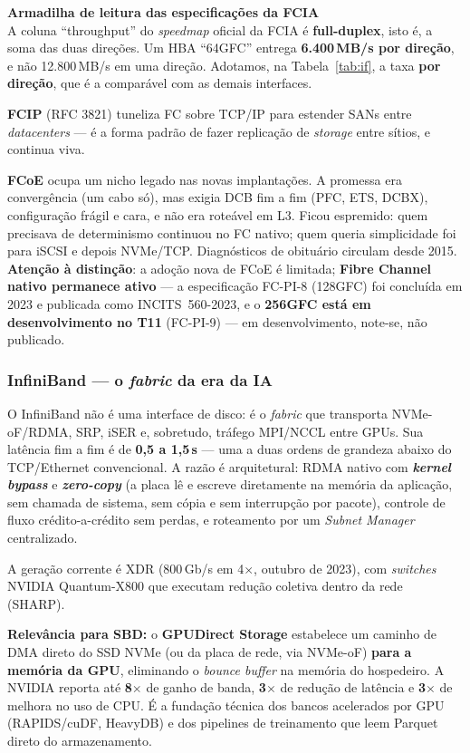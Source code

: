 \documentclass[11pt,a4paper]{article}
\newcommand{\correcao}[2]{%
  \begin{center}\begin{minipage}{0.96\textwidth}
  \colorbox{fundo}{\begin{minipage}{\dimexpr\linewidth-2\fboxsep}
  \vspace{3pt}\textbf{\color{laranja}#1}\\[2pt]\small #2\vspace{4pt}
  \end{minipage}}\end{minipage}\end{center}}
\begin{document}
\correcao{Armadilha de leitura das especificações da FCIA}{%
A coluna ``throughput'' do \emph{speedmap} oficial da FCIA é \textbf{full-duplex}, isto é,
a soma das duas direções. Um HBA ``64GFC'' entrega \textbf{6.400\,MB/s por direção}, e não
12.800\,MB/s em uma direção. Adotamos, na Tabela~\ref{tab:if}, a taxa \textbf{por direção},
que é a comparável com as demais interfaces.}

\textbf{FCIP} (RFC 3821) tuneliza FC sobre TCP/IP para estender SANs entre \emph{datacenters}
--- é a forma padrão de fazer replicação de \emph{storage} entre sítios, e continua viva.

\textbf{FCoE} ocupa um nicho legado nas novas implantações. A promessa era convergência (um cabo só), mas exigia
DCB fim a fim (PFC, ETS, DCBX), configuração frágil e cara, e não era roteável em L3. Ficou
espremido: quem precisava de determinismo continuou no FC nativo; quem queria simplicidade
foi para iSCSI e depois NVMe/TCP. Diagnósticos de obituário circulam desde 2015.
\textbf{Atenção à distinção}: a adoção nova de FCoE é limitada;
\textbf{Fibre Channel nativo permanece ativo} --- a
especificação FC-PI-8 (128GFC) foi concluída em 2023 e publicada como INCITS~560-2023, e o
\textbf{256GFC está em desenvolvimento no T11} (FC-PI-9) --- em desenvolvimento, note-se,
não publicado.

\subsubsection{InfiniBand --- o \emph{fabric} da era da IA}

O InfiniBand não é uma interface de disco: é o \emph{fabric} que transporta NVMe-oF/RDMA,
SRP, iSER e, sobretudo, tráfego MPI/NCCL entre GPUs. Sua latência fim a fim é de
\textbf{0,5 a 1,5\,\textmu s} --- uma a duas ordens de grandeza abaixo do TCP/Ethernet
convencional. A razão é arquitetural: RDMA nativo com \textbf{\emph{kernel bypass}} e
\textbf{\emph{zero-copy}} (a placa lê e escreve diretamente na memória da aplicação, sem
chamada de sistema, sem cópia e sem interrupção por pacote), controle de fluxo
crédito-a-crédito sem perdas, e roteamento por um \emph{Subnet Manager} centralizado.

A geração corrente é XDR (800\,Gb/s em 4$\times$, outubro de 2023), com \emph{switches}
NVIDIA Quantum-X800 que executam redução coletiva dentro da rede (SHARP).

\textbf{Relevância para SBD:} o \textbf{GPUDirect Storage} estabelece um caminho de DMA
direto do SSD NVMe (ou da placa de rede, via NVMe-oF) \textbf{para a memória da GPU},
eliminando o \emph{bounce buffer} na memória do hospedeiro. A NVIDIA reporta até
\textbf{8$\times$} de ganho de banda, \textbf{3$\times$} de redução de latência e
\textbf{3$\times$} de melhora no uso de CPU. É a fundação técnica dos bancos acelerados por
GPU (RAPIDS/cuDF, HeavyDB) e dos pipelines de treinamento que leem Parquet direto do
armazenamento.
\end{document}
